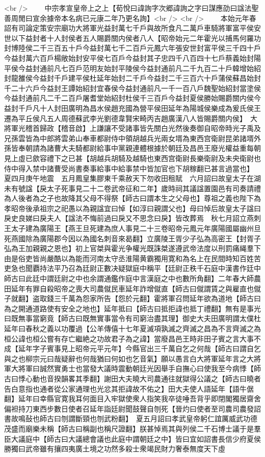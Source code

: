 <br />
　　中宗孝宣皇帝上之上【荀悅曰諱詢字次郷諱詢之字曰謀應劭曰諡法聖善周閒曰宣余據帝本名病已元康二年乃更名詢】<br />
<br />
　　本始元年春詔有司論定策安宗廟功大將軍光益封萬七千戶與故所食凡二萬戶車騎將軍富平侯安世以下益封者十人封侯者五人賜爵關内侯者八人【昭帝始元二年霍光以捕馬何羅功封博陸侯二千三百五十戶今益封萬七千二百戶元鳳六年張安世封富平侯三千四十戶今益封萬六百戶楊敞始封安平侯七百戶今益封其子忠四千八百四十七戶蔡義始封陽平侯今益封通前凡七百戶范明友始封平陵侯今益封通前凡二千九百二十戶韓增始紹封龍雒侯今益封千戶建平侯杜延年始封二千戶今益封二千三百六十戶蒲侯蘇昌始封千二十六戶今益封王譚始紹封宜春侯今益封通前凡一千一百八戶魏聖始紹封當塗侯今益封通前凡二千二百戶屠耆堂始紹封杜侯千三百戶今益封夏侯勝始賜爵關内侯今益封千戶凡十人封田廣明為昌水侯趙充國為營平侯田延年為陽城侯樂成為爰氏侯王遷為平丘侯凡五人周德蘇武李光劉德韋賢宋畸丙吉趙廣漢八人皆賜爵關内侯】　大將軍光稽首歸政【稽音啟】上謙讓不受諸事皆先關白光然後奏御自昭帝時光子禹及兄孫雲皆為中郎將雲弟山奉車都尉侍中領胡越兵光兩女壻為東西宫衛尉昆弟諸壻外孫皆奉朝請為諸曹大夫騎都尉給事中黨親連體根據於朝廷及昌邑王廢光權益重每朝見上虛已歛容禮下之已甚【胡越兵胡騎及越騎也東西宫衛尉長樂衛尉及未央衛尉也侍中得入禁中諸曹受尚書奏事給事中給事禁中皆加官也下胡稼翻已甚言過當也】　夏四月庚午地震　五月鳳皇集膠東千乘赦天下勿收田租賦　六月詔曰故皇太子在湖未有號諡【戾太子死事見二十二卷武帝征和二年】歲時祠其議諡置園邑有司奏請禮為人後者為之子也故降其父母不得祭【師古曰謂本生之父母也】尊祖之義也陛下為孝昭帝後承祖宗之祀愚以為親諡宜曰悼【如淳曰親謂父也】母曰悼后故皇太子諡曰戾史良娣曰戾夫人【諡法不悔前過曰戾又不思念曰戾】皆改葬焉　秋七月詔立燕刺王太子建為廣陽王【燕王旦死建為庶人事見二十三卷昭帝元鳳元年廣陽國屬幽州旦死燕國除為廣陽郡今因以為國名刺音來曷翻】立廣陵王胥少子弘為高密王【封胥子弘為王加親親之恩也】初上官桀與霍光争權光既誅桀遂遵武帝法度以刑罰痛䋲羣下由是俗吏皆尚嚴酷以為能而河南太守丞淮陽黄霸獨用寛和為名上在民間時知百姓苦吏急也聞覇持法平乃召為廷尉正數决疑獄庭中稱平【廷尉正秩千石庭中漢書作廷中師古曰此廷中謂廷尉之中也余謂通鑑作庭中言漢庭之中也數所角翻】二年春大師農田延年有罪自殺昭帝之喪大司農僦民車延年詐增僦直【師古曰僦謂賃之與雇直也僦子就翻】盗取錢三千萬為怨家所告【怨於元翻】霍將軍召問延年欲為道地【師古曰為之開通道路使有安全之地也】延年抵曰【師古曰抵拒諱也抵丁禮翻】無有是事光曰既無事當窮竟【師古曰既無實事當令有司窮治盡其理】御史大夫田廣明謂太僕杜延年曰春秋之義以功覆過【公羊傳僖十七年夏滅項孰滅之齊滅之昌為不言齊滅之為桓公諱也桓公嘗有存亡繼絶之功故君子為之諱】當廢昌邑王時非田子賓之言大事不成【延年字子賓事見上昭帝元平元年】今縣官出三千萬自乞之何哉【師古曰謂自乞與之也柳宗元曰哉疑辭也何哉猶曰何如也乞音氣】願以愚言白大將軍延年言之大將軍大將軍曰誠然實勇士也當發大議時震動朝廷光因舉手自撫心曰使我至今病悸【師古曰悸心動也音揆韻畧其季翻】謝田大夫曉大司農通往就獄得公議之【師古曰曉者告白意指也通者從公家通理也光忿其拒諱故不佑之】田大夫使人語延年【語牛倨翻】延年曰幸縣官寛我耳何面目入牢獄使衆人指笑我卒徒唾吾背乎即閉閣獨居齋舍偏袒持刀東西步數日使者召延年詣廷尉聞鼓聲自刎死【晉灼曰使者至司農司農發詔書故鳴鼔也師古曰刎謂斷頸也刎武粉翻】　夏五月詔曰孝武皇帝躬仁誼厲威武功德茂盛而廟樂未稱【師古曰稱副也稱尺證翻】朕甚悼焉其與列侯二千石博士議于是羣臣大議庭中【師古曰大議總會議也此庭中謂朝廷之中】皆曰宜如詔書長信少府夏侯勝獨曰武帝雖有攘四夷廣土境之功然多殺士衆竭民財力奢泰無度天下虛